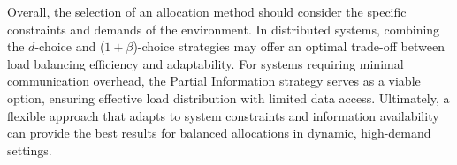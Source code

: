 \documentclass[11pt]{article}
\begin{document}
Overall, the selection of an allocation method should consider the specific
constraints and demands of the environment. In distributed systems, combining
the $d$-choice and ($1+\beta$)-choice strategies may offer an optimal trade-off
between load balancing efficiency and adaptability. For systems requiring
minimal communication overhead, the Partial Information strategy serves as a
viable option, ensuring effective load distribution with limited data access.
Ultimately, a flexible approach that adapts to system constraints and
information availability can provide the best results for balanced allocations
in dynamic, high-demand settings.
\end{document}
